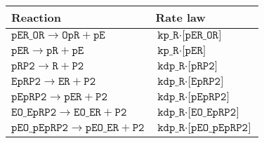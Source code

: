 \begin{tabular}{ll}
\textbf{Reaction} & \textbf{Rate law} \\
\midrule
$ \texttt{pER\_OR}  \rightarrow \texttt{OpR}  +  \texttt{pE}  $ & $ \texttt{kp\_R}  \cdot  \texttt{[pER\_OR]}  $ \\
$ \texttt{pER}  \rightarrow \texttt{pR}  +  \texttt{pE}  $ & $ \texttt{kp\_R}  \cdot  \texttt{[pER]}  $ \\
$ \texttt{pRP2}  \rightarrow \texttt{R}  +  \texttt{P2}  $ & $ \texttt{kdp\_R}  \cdot  \texttt{[pRP2]}  $ \\
$ \texttt{EpRP2}  \rightarrow \texttt{ER}  +  \texttt{P2}  $ & $ \texttt{kdp\_R}  \cdot  \texttt{[EpRP2]}  $ \\
$ \texttt{pEpRP2}  \rightarrow \texttt{pER}  +  \texttt{P2}  $ & $ \texttt{kdp\_R}  \cdot  \texttt{[pEpRP2]}  $ \\
$ \texttt{EO\_EpRP2}  \rightarrow \texttt{EO\_ER}  +  \texttt{P2}  $ & $ \texttt{kdp\_R}  \cdot  \texttt{[EO\_EpRP2]}  $ \\
$ \texttt{pEO\_pEpRP2}  \rightarrow \texttt{pEO\_ER}  +  \texttt{P2}  $ & $ \texttt{kdp\_R}  \cdot  \texttt{[pEO\_pEpRP2]}  $ \\
\end{tabular}